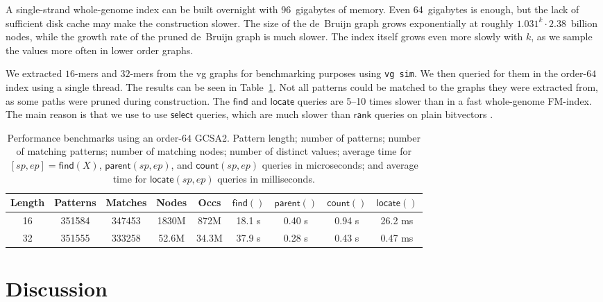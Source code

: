 \documentclass[a4paper,UKenglish]{lipics-v2016}
\newcommand{\rank}{\ensuremath{\mathsf{rank}}}
\newcommand{\select}{\ensuremath{\mathsf{select}}}
\newcommand{\find}{\ensuremath{\mathsf{find}}}
\newcommand{\locate}{\ensuremath{\mathsf{locate}}}
\newcommand{\parent}{\ensuremath{\mathsf{parent}}}
\newcommand{\countq}{\ensuremath{\mathsf{count}}}
\newcommand{\kmer}[1]{$#1$\nobreakdash-mer}
\newcommand{\orderk}[1]{order\nobreakdash-$#1$}
\begin{document}
A single-strand whole-genome index can be built overnight with 96~gigabytes of memory. Even 64~gigabytes is enough, but the lack of sufficient disk cache may make the construction slower. The size of the de~Bruijn graph grows exponentially at roughly $1.031^{k} \cdot 2.38$~billion nodes, while the growth rate of the pruned de~Bruijn graph is much slower. The index itself grows even more slowly with $k$, as we sample the values more often in lower order graphs.

We extracted \kmer{16}s and \kmer{32}s from the vg graphs for benchmarking purposes using \texttt{vg sim}. We then queried for them in the \orderk{64} index using a single thread. The results can be seen in Table~\ref{table:benchmark}. Not all patterns could be matched to the graphs they were extracted from, as some paths were pruned during construction. The $\find$ and $\locate$ queries are 5\nobreakdash--10 times slower than in a fast whole-genome FM\nobreakdash-index. The main reason is that we use to use $\select$ queries, which are much slower than $\rank$ queries on plain bitvectors \cite{Gog2014}.

\begin{table}[t!]
\begin{center}
\caption{Performance benchmarks using an \orderk{64} GCSA2. Pattern length; number of patterns; number of matching patterns; number of matching nodes; number of distinct values; average time for $[sp, ep] = \find(X)$, $\parent(sp, ep)$, and $\countq(sp, ep)$ queries in microseconds; and average time for $\locate(sp, ep)$ queries in milliseconds.}\label{table:benchmark}
\begin{tabular}{c|cc|cc|cccc}
\hline
\textbf{Length} & \textbf{Patterns} & \textbf{Matches} & \textbf{Nodes} & \textbf{Occs} & $\find()$ & $\parent()$ & $\countq()$ & $\locate()$ \\
\hline
16 & 351584 & 347453 & 1830M &  872M & 18.1 \textmu{}s & 0.40 \textmu{}s & 0.94 \textmu{}s & 26.2 ms \\
32 & 351555 & 333258 & 52.6M & 34.3M & 37.9 \textmu{}s & 0.28 \textmu{}s & 0.43 \textmu{}s & 0.47 ms \\
\hline
\end{tabular}
\end{center}
\end{table}


\section{Discussion}
\end{document}
